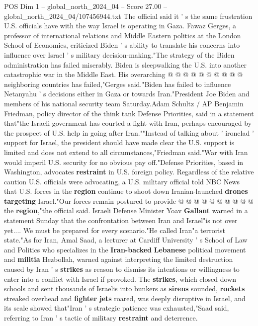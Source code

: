 \begin{textsample}{POS Dim 1 – global\_north\_2024\_04 – Score 27.00 – global\_north\_2024\_04/107456944.txt}
The official said it ' s the same frustration U.S. officials have with the way Israel is operating in Gaza.
Fawaz Gerges, a professor of international relations and Middle Eastern politics at the London School of Economics, criticized Biden ' s ability to translate his concerns into influence over Israel ' s military decision-making."The strategy of the Biden administration has failed miserably.
Biden is sleepwalking the U.S. into another catastrophic war in the Middle East.
His overarching @ @ @ @ @ @ @ @ @ @ neighboring countries has failed,"Gerges said."Biden has failed to influence Netanyahu ' s decisions either in Gaza or towards Iran."President Joe Biden and members of his national security team Saturday.Adam Schultz / AP Benjamin Friedman, policy director of the think tank Defense Priorities, said in a statement that"the Israeli government has courted a fight with Iran, perhaps encouraged by the prospect of U.S. help in going after Iran.""Instead of talking about ' ironclad ' support for Israel, the president should have made clear the U.S. support is limited and does not extend to all circumstances,"Friedman said."War with Iran would imperil U.S. security for no obvious pay off."Defense Priorities, based in Washington, advocates \textbf{restraint} in U.S. foreign policy.
Regardless of the relative caution U.S. officials were advocating, a U.S. military official told NBC News that U.S. forces in the \textbf{region} continue to shoot down Iranian-launched \textbf{drones} \textbf{targeting} Israel."Our forces remain postured to provide @ @ @ @ @ @ @ @ @ @ the \textbf{region},"the official said.
Israeli Defense Minister Yoav \textbf{Gallant} warned in a statement Sunday that the confrontation between Iran and Israel"is not over yet....
We must be prepared for every scenario."He called Iran"a terrorist state."As for Iran, Amal Saad, a lecturer at Cardiff University ' s School of Law and Politics who specializes in the \textbf{Iran-backed} \textbf{Lebanese} political movement and \textbf{militia} Hezbollah, warned against interpreting the limited destruction caused by Iran ' s \textbf{strikes} as reason to dismiss its intentions or willingness to enter into a conflict with Israel if provoked.
The \textbf{strikes}, which closed down schools and sent thousands of Israelis into bunkers as \textbf{sirens} sounded, \textbf{rockets} streaked overhead and \textbf{fighter} \textbf{jets} roared, was deeply disruptive in Israel, and its scale showed that"Iran ' s strategic patience was exhausted,"Saad said, referring to Iran ' s tactic of military \textbf{restraint} and deterrence.

\end{textsample}

